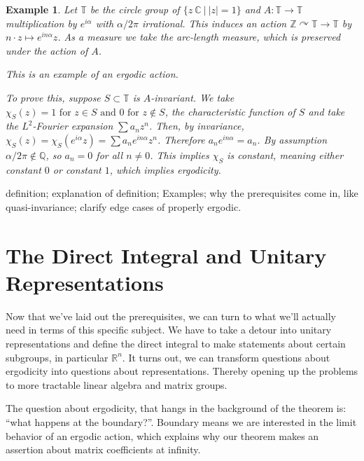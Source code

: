 \documentclass[
  12pt
]{article}
\theoremstyle{break}
\theoremstyle{plain}
\newtheorem*{ex}{Example}
\newcommand{\bbr}{\ensuremath{\mathbb{R}}\xspace}
\newcommand{\bbc}{\ensuremath{\mathbb{C}}\xspace}
\begin{document}
  \begin{ex}
    Let $\mathbb{T}$ be the circle group of $\{z\ \bbc \ | \ |z| = 1 \}$ and
    $A: \mathbb{T} \rightarrow \mathbb{T}$ multiplication by $e^{i\alpha}$ with
    $\alpha/2\pi$ irrational. This induces an action
    $\mathbb{Z}\curvearrowright\mathbb{T} \rightarrow \mathbb{T}$ by $ n\cdot z
    \mapsto e^{in\alpha}z$. As a measure we take the arc-length measure, which
    is preserved under the action of $A$.

    This is an example of an ergodic action.

    To prove this, suppose $S \subset \mathbb{T}$ is $A$-invariant. We take
    $\chi_S(z) = 1 \text{ for } z\in S \text{ and } 0 \text{ for } z \notin S$,
    the characteristic function of $S$ and take the $L^2$-Fourier expansion
    $\sum a_n z^n$. Then, by invariance, $\chi_S(z) = \chi_S(e^{i\alpha}z) =
    \sum a_n e^{in\alpha}z^n$. Therefore $a_ne^{in\alpha} = a_n$. By assumption
    $\alpha/2\pi \notin \mathbb{Q}$, so $a_n = 0$ for all $n \neq 0$. This
    implies $\chi_S$ is constant, meaning either constant $0$ or constant $1$,
    which implies ergodicity.
  \end{ex}
  definition; explanation of definition; Examples; why the prerequisites
  come in, like quasi-invariance; clarify edge cases of properly ergodic.




\hypertarget{the-direct-integral-and-unitary-representations}{%
\section{The Direct Integral and Unitary Representations}\label{the-direct-integral-and-unitary-representations}}


  Now that we've laid out the prerequisites, we can turn to what we'll actually need in terms of this specific subject.
  We have to take a detour into unitary
  representations and define the direct integral to make statements about
  certain subgroups, in particular $\bbr^n$.
  It turns out, we can transform questions about ergodicity into questions about representations.
  Thereby opening up the problems to more tractable linear algebra and matrix groups.

  The question about ergodicity, that hangs in the background of the theorem is:
  ``what happens at the boundary?''. Boundary means we are interested in the limit behavior of an ergodic action, which explains why our theorem makes an assertion about matrix coefficients at infinity.
\end{document}
